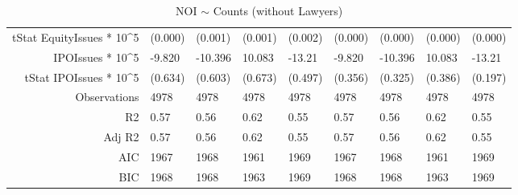 \begin{table}[ht]
\begin{tabular}{rllllllll}
  tStat EquityIssues * 10^5 & (0.000) & (0.001) & (0.001) & (0.002) & (0.000) & (0.000) & (0.000) & (0.000) \\ 
  IPOIssues * 10^5 & -9.820 & -10.396 & 10.083 & -13.21 & -9.820 & -10.396 & 10.083 & -13.21 \\ 
  tStat IPOIssues * 10^5 & (0.634) & (0.603) & (0.673) & (0.497) & (0.356) & (0.325) & (0.386) & (0.197) \\ 
  Observations & 4978 & 4978 & 4978 & 4978 & 4978 & 4978 & 4978 & 4978 \\ 
  R2 & 0.57 & 0.56 & 0.62 & 0.55 & 0.57 & 0.56 & 0.62 & 0.55 \\ 
  Adj R2 & 0.57 & 0.56 & 0.62 & 0.55 & 0.57 & 0.56 & 0.62 & 0.55 \\ 
  AIC & 1967 & 1968 & 1961 & 1969 & 1967 & 1968 & 1961 & 1969 \\ 
  BIC & 1968 & 1968 & 1963 & 1969 & 1968 & 1968 & 1963 & 1969 \\ 
   \hline
\end{tabular}
\caption{NOI $\sim$ Counts (without Lawyers)} 
\end{table}
